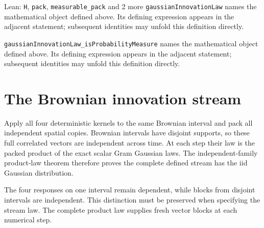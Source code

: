 \documentclass[11pt,a4paper]{article}
\begin{document}
\begin{leanbox}{Lean: \texttt{H}, \texttt{pack}, \texttt{measurable\_\allowbreak{}pack} and 2 more}
\texttt{gaussian\allowbreak{}Innovation\allowbreak{}Law} names the mathematical object defined above. Its defining expression appears in the adjacent statement; subsequent identities may unfold this definition directly.




\texttt{gaussian\allowbreak{}Innovation\allowbreak{}Law\_\allowbreak{}is\allowbreak{}Probability\allowbreak{}Measure} names the mathematical object defined above. Its defining expression appears in the adjacent statement; subsequent identities may unfold this definition directly.
\end{leanbox}

\section{\texorpdfstring{The Brownian innovation stream}{The Brownian innovation stream}}


Apply all four deterministic kernels to the same Brownian interval and pack all independent spatial copies. Brownian intervals have disjoint supports, so these full correlated vectors are independent across time. At each step their law is the packed product of the exact scalar Gram Gaussian laws. The independent-family product-law theorem therefore proves the complete defined stream has the iid Gaussian distribution.



The four responses on one interval remain dependent, while blocks from disjoint intervals are independent. This distinction must be preserved when specifying the stream law. The complete product law supplies fresh vector blocks at each numerical step.
\end{document}
